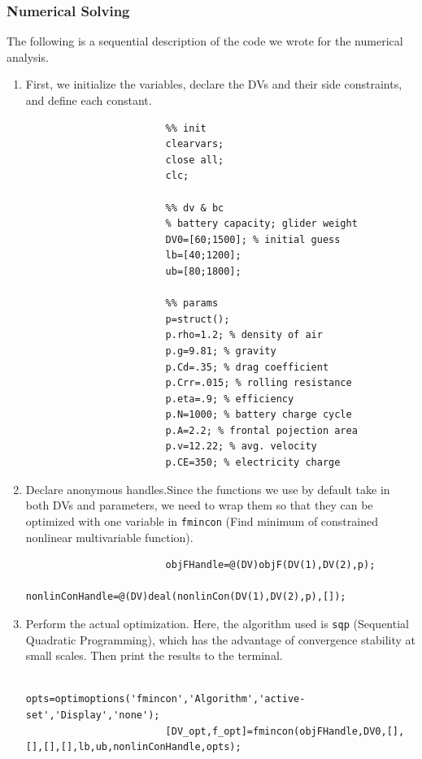 \documentclass[11pt,twocolumn]{article}
\begin{document}
            \subsubsection{Numerical Solving}
                The following is a sequential description of the code we wrote for the numerical analysis.
                \begin{enumerate}
                    \item First, we initialize the variables, declare the DVs and their side constraints, and define each constant.
                    \begin{lstlisting}
                        %% init
                        clearvars;
                        close all;
                        clc;

                        %% dv & bc
                        % battery capacity; glider weight
                        DV0=[60;1500]; % initial guess
                        lb=[40;1200];
                        ub=[80;1800];

                        %% params
                        p=struct();
                        p.rho=1.2; % density of air
                        p.g=9.81; % gravity
                        p.Cd=.35; % drag coefficient
                        p.Crr=.015; % rolling resistance
                        p.eta=.9; % efficiency
                        p.N=1000; % battery charge cycle
                        p.A=2.2; % frontal pojection area
                        p.v=12.22; % avg. velocity
                        p.CE=350; % electricity charge
                    \end{lstlisting}
                    \item Declare anonymous handles.Since the functions we use by default take in both DVs and parameters, we need to wrap them so that they can be optimized with one variable in \texttt{fmincon} (Find minimum of constrained nonlinear multivariable function).
                    \begin{lstlisting}[firstnumber=last]
                        %% anonymous handles
                        objFHandle=@(DV)objF(DV(1),DV(2),p);
                        nonlinConHandle=@(DV)deal(nonlinCon(DV(1),DV(2),p),[]);
                    \end{lstlisting}
                    \item Perform the actual optimization. Here, the algorithm used is \texttt{sqp} (Sequential Quadratic Programming), which has the advantage of convergence stability at small scales. Then print the results to the terminal.
                    \begin{lstlisting}[firstnumber=last]
                        %% run optimization
                        opts=optimoptions('fmincon','Algorithm','active-set','Display','none');
                        [DV_opt,f_opt]=fmincon(objFHandle,DV0,[],[],[],[],lb,ub,nonlinConHandle,opts);


\end{lstlisting}
\end{enumerate}
\end{document}
